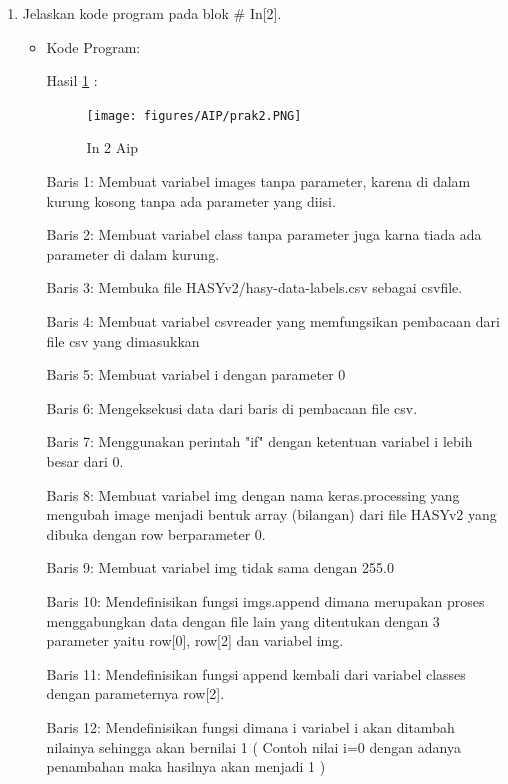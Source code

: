 \begin{enumerate}
\item Jelaskan kode program pada blok \# In[2].
\begin{itemize}
\item Kode Program:

\par Hasil \ref{in2aip} :
\begin{figure}[!hbtp]
\centering
\texttt{[image: figures/AIP/prak2.PNG]}
\caption{In 2 Aip}
\label{in2aip}
\end{figure}
\par Baris 1: Membuat variabel images tanpa parameter, karena di dalam kurung kosong tanpa ada parameter yang diisi.
\par Baris 2: Membuat variabel class tanpa parameter juga karna tiada ada parameter di dalam kurung.
\par Baris 3: Membuka file HASYv2/hasy-data-labels.csv sebagai csvfile.
\par Baris 4: Membuat variabel csvreader yang memfungsikan pembacaan dari file csv yang dimasukkan
\par Baris 5: Membuat variabel i dengan parameter 0
\par Baris 6: Mengeksekusi data dari baris di pembacaan file csv.
\par Baris 7: Menggunakan perintah "if" dengan ketentuan variabel i lebih besar dari  0.
\par Baris 8: Membuat variabel img dengan nama keras.processing yang mengubah image menjadi bentuk array (bilangan) dari file HASYv2 yang dibuka dengan row berparameter 0.
\par Baris 9: Membuat variabel img tidak sama dengan 255.0
\par Baris 10: Mendefinisikan fungsi imgs.append dimana merupakan proses menggabungkan data dengan file lain  yang ditentukan dengan 3 parameter yaitu row[0], row[2] dan variabel img.
\par Baris 11: Mendefinisikan fungsi append kembali dari variabel classes dengan parameternya row[2].
\par Baris 12: Mendefinisikan fungsi dimana i variabel i akan ditambah nilainya sehingga akan bernilai 1 ( Contoh nilai i=0 dengan adanya penambahan maka hasilnya akan menjadi 1 )
\end{itemize}
\par



\end{enumerate}

